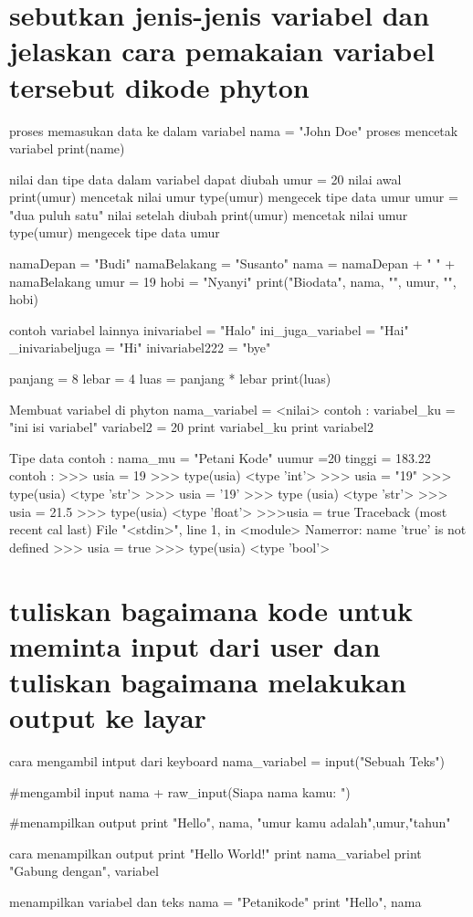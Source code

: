 \begin{enumerate}
\begin{enumerate}
\section{sebutkan jenis-jenis variabel dan jelaskan cara pemakaian variabel tersebut dikode phyton} 
proses memasukan data ke dalam variabel nama = "John Doe"
proses mencetak variabel
print(name)

nilai dan tipe data dalam variabel dapat diubah
umur = 20 nilai awal
print(umur) mencetak nilai umur
type(umur) mengecek tipe data umur
umur = "dua puluh satu" nilai setelah diubah
print(umur) mencetak nilai umur
type(umur) mengecek tipe data umur

namaDepan = "Budi"
namaBelakang = "Susanto"
nama = namaDepan + " " + namaBelakang
umur = 19
hobi = "Nyanyi"
print("Biodata\n", nama, "\n", umur, "\n", hobi)

contoh variabel lainnya
inivariabel = "Halo"
ini_juga_variabel = "Hai"
_inivariabeljuga = "Hi"
inivariabel222 = "bye"

panjang = 8
lebar = 4
luas = panjang * lebar
print(luas)

Membuat variabel di phyton
nama_variabel = <nilai>
contoh :
variabel_ku = "ini isi variabel"
variabel2 = 20
print variabel_ku
print variabel2

Tipe data
contoh :
nama_mu = "Petani Kode"
uumur =20
tinggi = 183.22
contoh :
>>> usia = 19
>>> type(usia)
<type 'int'>
>>> usia = "19"
>>> type(usia)
<type 'str'>
>>> usia = '19'
>>> type (usia)
<type 'str'>
>>> usia = 21.5
>>> type(usia)
<type 'float'>
>>>usia = true
Traceback (most recent cal last)
File "<stdin>", line 1, in <module>
Namerror: name 'true' is not defined
>>> usia = true
>>> type(usia)
<type 'bool'>

\section{tuliskan bagaimana kode untuk meminta input dari user dan tuliskan bagaimana melakukan output ke layar}
cara mengambil intput dari keyboard
nama_variabel = input("Sebuah Teks")

#mengambil input
nama + raw_input(Siapa nama kamu: ")

#menampilkan output
print "Hello", nama, "umur kamu adalah",umur,"tahun"

cara menampilkan output
print "Hello World!"
print nama_variabel
print "Gabung dengan", variabel

menampilkan variabel dan teks
nama = "Petanikode"
print "Hello", nama


\end{enumerate}
\end{enumerate}
